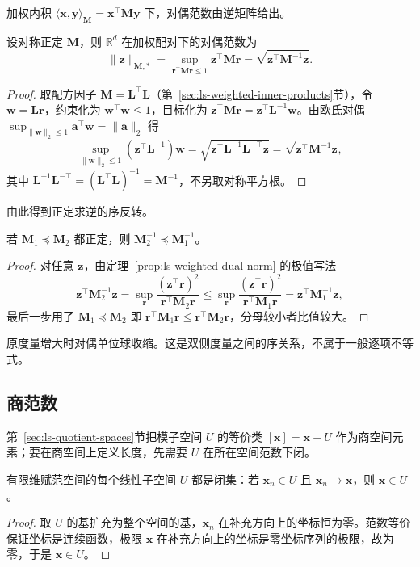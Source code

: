 加权内积 $\langle\bm x,\bm y\rangle_{\bm M}=\bm x^\top\bm M\bm y$ 下，对偶范数由逆矩阵给出。
\begin{theorem}[加权对偶范数]
\label{prop:ls-weighted-dual-norm}
设对称正定 $\bm M$，则 $\mathbb R^d$ 在加权配对下的对偶范数为
\[
 \lVert\bm z\rVert_{\bm M,*}
 =\sup_{\bm r^\top\bm M\bm r\leq1}\bm z^\top\bm M\bm r
 =\sqrt{\bm z^\top\bm M^{-1}\bm z}.
\]
\end{theorem}
\begin{proof}
取配方因子 $\bm M=\bm L^\top\bm L$（第~\ref{sec:ls-weighted-inner-products}节），令 $\bm w=\bm L\bm r$，约束化为 $\bm w^\top\bm w\leq1$，目标化为 $\bm z^\top\bm M\bm r=\bm z^\top\bm L^{-1}\bm w$。由欧氏对偶 $\sup_{\lVert\bm w\rVert_2\leq1}\bm a^\top\bm w=\lVert\bm a\rVert_2$ 得
\[
 \sup_{\lVert\bm w\rVert_2\leq1}(\bm z^\top\bm L^{-1})\bm w
 =\sqrt{\bm z^\top\bm L^{-1}\bm L^{-\top}\bm z}
 =\sqrt{\bm z^\top\bm M^{-1}\bm z},
\]
其中 $\bm L^{-1}\bm L^{-\top}=(\bm L^\top\bm L)^{-1}=\bm M^{-1}$，不另取对称平方根。
\end{proof}

由此得到正定求逆的序反转。
\begin{theorem}[正定求逆的序反转]
\label{cor:ls-inverse-order-reversal}
若 $\bm M_1\preceq\bm M_2$ 都正定，则 $\bm M_2^{-1}\preceq\bm M_1^{-1}$。
\end{theorem}
\begin{proof}
对任意 $\bm z$，由定理~\ref{prop:ls-weighted-dual-norm} 的极值写法
\[
 \bm z^\top\bm M_2^{-1}\bm z
 =\sup_{\bm r}\frac{(\bm z^\top\bm r)^2}{\bm r^\top\bm M_2\bm r}
 \leq\sup_{\bm r}\frac{(\bm z^\top\bm r)^2}{\bm r^\top\bm M_1\bm r}
 =\bm z^\top\bm M_1^{-1}\bm z,
\]
最后一步用了 $\bm M_1\preceq\bm M_2$ 即 $\bm r^\top\bm M_1\bm r\leq\bm r^\top\bm M_2\bm r$，分母较小者比值较大。
\end{proof}
原度量增大时对偶单位球收缩。这是双侧度量之间的序关系，不属于一般逐项不等式。

\subsection{商范数}
\label{sec:ls-quotient-norms}

第~\ref{sec:ls-quotient-spaces}节把模子空间 $U$ 的等价类 $[\bm x]=\bm x+U$ 作为商空间元素；要在商空间上定义长度，先需要 $U$ 在所在空间范数下闭。
\begin{theorem}[有限维子空间闭性]
\label{thm:ls-subspace-closed}
有限维赋范空间的每个线性子空间 $U$ 都是闭集：若 $\bm x_n\in U$ 且 $\bm x_n\to\bm x$，则 $\bm x\in U$。
\end{theorem}
\begin{proof}
取 $U$ 的基扩充为整个空间的基，$\bm x_n$ 在补充方向上的坐标恒为零。范数等价保证坐标是连续函数，极限 $\bm x$ 在补充方向上的坐标是零坐标序列的极限，故为零，于是 $\bm x\in U$。
\end{proof}

